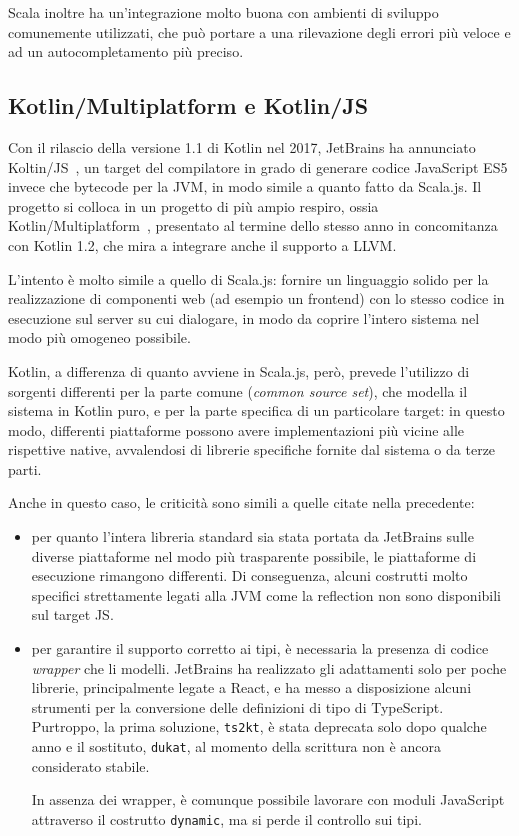      Scala inoltre ha un'integrazione molto buona con ambienti di sviluppo comunemente utilizzati, che può portare a una rilevazione degli errori più veloce e ad un autocompletamento più preciso.

    \subsection{Kotlin/Multiplatform e Kotlin/JS}\label{subsec:kotlinjs}
      Con il rilascio della versione 1.1 di Kotlin nel 2017, JetBrains ha annunciato Koltin/JS~\cite{Belov2017}, un target del compilatore in grado di generare codice JavaScript ES5 invece che bytecode per la JVM, in modo simile a quanto fatto da Scala.js.
      Il progetto si colloca in un progetto di più ampio respiro, ossia Kotlin/Multiplatform~\cite{Jemerov2017}, presentato al termine dello stesso anno in concomitanza con Kotlin 1.2, che mira a integrare anche il supporto a LLVM\@.

      L'intento è molto simile a quello di Scala.js:
      fornire un linguaggio solido per la realizzazione di componenti web (ad esempio un frontend) con lo stesso codice in esecuzione sul server su cui dialogare, in modo da coprire l'intero sistema nel modo più omogeneo possibile.

      Kotlin, a differenza di quanto avviene in Scala.js, però, prevede l'utilizzo di sorgenti differenti per la parte comune (\emph{common source set}), che modella il sistema in Kotlin puro, e per la parte specifica di un particolare target:
      in questo modo, differenti piattaforme possono avere implementazioni più vicine alle rispettive native, avvalendosi di librerie specifiche fornite dal sistema o da terze parti.

      Anche in questo caso, le criticità sono simili a quelle citate nella  precedente:
      \begin{itemize}
        \item
          per quanto l'intera libreria standard sia stata portata da JetBrains sulle diverse piattaforme nel modo più trasparente possibile, le piattaforme di esecuzione rimangono differenti.
          Di conseguenza, alcuni costrutti molto specifici strettamente legati alla JVM come la reflection non sono disponibili sul target JS\@.
        \item
          per garantire il supporto corretto ai tipi, è necessaria la presenza di codice \emph{wrapper} che li modelli.
          JetBrains ha realizzato gli adattamenti solo per poche librerie, principalmente legate a React, e ha messo a disposizione alcuni strumenti per la conversione delle definizioni di tipo di TypeScript.
          Purtroppo, la prima soluzione, \texttt{ts2kt}, è stata deprecata solo dopo qualche anno e il sostituto, \texttt{dukat}, al momento della scrittura non è ancora considerato stabile.

          In assenza dei wrapper, è comunque possibile lavorare con moduli JavaScript attraverso il costrutto \texttt{dynamic}, ma si perde il controllo sui tipi.
      \end{itemize}


